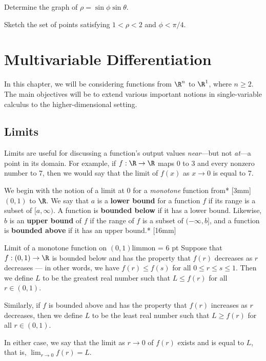 \documentclass{watsonbook}
\begin{document}
\begin{exercise}{}{}
  Determine the graph of $\rho = \sin \phi \sin \theta$.
\end{exercise}

\begin{exercise}{}{}
  Sketch the set of points satisfying $1 < \rho < 2$ and $\phi < \pi/4$.
\end{exercise}

\chapter{Multivariable Differentiation}

In this chapter, we will be considering functions from $\R^n$ to
$\R^1$, where $n \geq 2$. The main objectives will be to extend
various important notions in single-variable calculus to the
higher-dimensional setting.

\section{Limits} \label{sec:limits}

Limits are useful for discussing a function's output values
\textit{near}---but not \textit{at}---a point in its domain. For
example, if $f:\R \to \R$ maps 0 to 3 and every nonzero number to 7,
then we would say that the limit of $f(x)$ as $x\to 0$ is equal to 7. 

We begin with the notion of a limit at 0 for a \textit{monotone}
function from* [3mm]
$(0,1)$ to $\R$. We say that $a$ is a \textbf{lower bound} for a
function $f$ if its range is a subset of $[a,\infty)$. A function is
\textbf{bounded below} if it has a lower bound. Likewise, $b$ is an
\textbf{upper bound} of $f$ if the range of $f$ is a subset of $(-\infty,b]$,
and a function is \textbf{bounded above} if it has an upper
bound.* [16mm]

\begin{defn}{Limit of a monotone function on $(0,1)$}{limmon} \parskip = 6 pt 
  Suppose that $f:(0,1) \to \R$ is bounded below and has the property
  that $f(r)$ decreases as $r$ decreases --- in other words,
  we have $f(r) \leq f(s)$ for all $0 \leq r \leq s \leq 1$. Then we define
  $L$ to be the greatest real number such that $L \leq f(r)$ for all
  $r\in (0,1)$. 

  Similarly, if $f$ is bounded above and has the property that $f(r)$
  increases as $r$ decreases, then we define $L$ to be the least real
  number such that $L \geq f(r)$ for all $r \in (0,1)$.

  In either case, we say that the limit as $r\to0$ of $f(r)$ exists
  and is equal to $L$, that is,
  $\displaystyle{\lim_{r\to 0} f(r) = L}$.
\end{defn}
\end{document}
